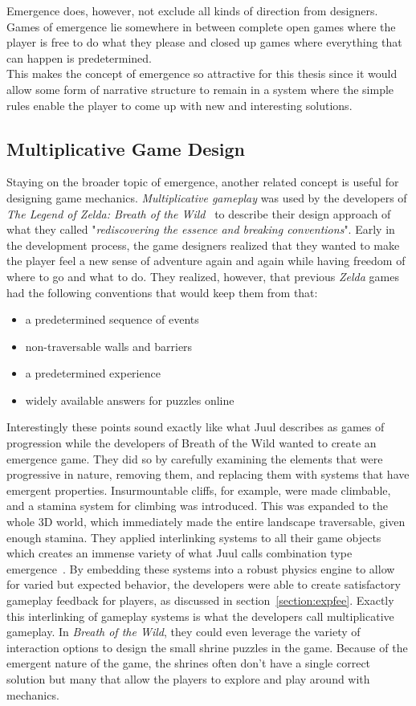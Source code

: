 Emergence does, however, not exclude all kinds of direction from designers. Games of emergence lie somewhere in between complete open games where the player is free to do what they please and closed up games where everything that can happen is predetermined.~\cite{Juul2002}\\ 
This makes the concept of emergence so attractive for this thesis since it would allow some form of narrative structure to remain in a system where the simple rules enable the player to come up with new and interesting solutions.
\subsection{Multiplicative Game Design}
Staying on the broader topic of emergence, another related concept is useful for designing game mechanics. \textit{Multiplicative gameplay} was used by the developers of \textit{The Legend of Zelda: Breath of the Wild}~\cite{zeldabotw} to describe their design approach of what they called "\textit{rediscovering the essence and breaking conventions}". Early in the development process, the game designers realized that they wanted to make the player feel a new sense of adventure again and again while having freedom of where to go and what to do. They realized, however, that previous \textit{Zelda} games had the following conventions that would keep them from that:
\begin{itemize}
	\item a predetermined sequence of events
	\item non-traversable walls and barriers
	\item a predetermined experience
	\item widely available answers for puzzles online
\end{itemize}
Interestingly these points sound exactly like what Juul describes as games of progression while the developers of Breath of the Wild wanted to create an emergence game. They did so by carefully examining the elements that were progressive in nature, removing them, and replacing them with systems that have emergent properties. Insurmountable cliffs, for example, were made climbable, and a stamina system for climbing was introduced. This was expanded to the whole 3D world, which immediately made the entire landscape traversable, given enough stamina. They applied interlinking systems to all their game objects which creates an immense variety of what Juul calls combination type emergence~\cite{Juul2002}. By embedding these systems into a robust physics engine to allow for varied but expected behavior, the developers were able to create satisfactory gameplay feedback for players, as discussed in section~\ref{section:expfee}. Exactly this interlinking of gameplay systems is what the developers call multiplicative gameplay. In \textit{Breath of the Wild}, they could even leverage the variety of interaction options to design the small shrine puzzles in the game. Because of the emergent nature of the game, the shrines often don't have a single correct solution but many that allow the players to explore and play around with mechanics.~\cite{fujibayashi2017}
